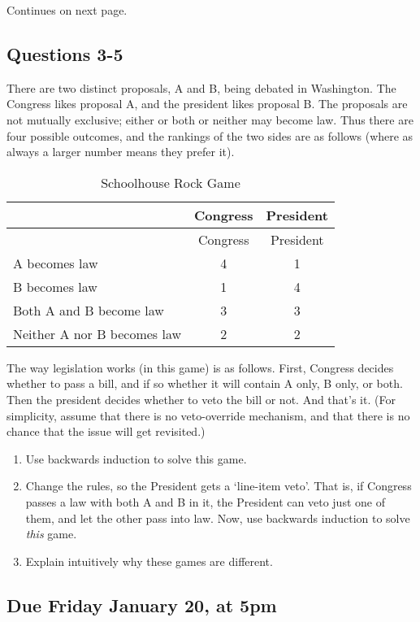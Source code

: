 \documentclass[
  11pt,
]{article}
\providecommand{\tightlist}{%
  \setlength{\itemsep}{0pt}\setlength{\parskip}{0pt}}
\begin{document}
Continues on next page.

\newpage

\hypertarget{questions-3-5}{%
\subsection{Questions 3-5}\label{questions-3-5}}

There are two distinct proposals, A and B, being debated in Washington.
The Congress likes proposal A, and the president likes proposal B. The
proposals are not mutually exclusive; either or both or neither may
become law. Thus there are four possible outcomes, and the rankings of
the two sides are as follows (where as always a larger number means they
prefer it).

\begin{longtable}[]{@{}lcc@{}}
\caption{Schoolhouse Rock Game}\tabularnewline
\toprule()
& Congress & President \\
\midrule()
\endfirsthead
\toprule()
& Congress & President \\
\midrule()
\endhead
A becomes law & 4 & 1 \\
B becomes law & 1 & 4 \\
Both A and B become law & 3 & 3 \\
Neither A nor B becomes law & 2 & 2 \\
\bottomrule()
\end{longtable}

The way legislation works (in this game) is as follows. First, Congress
decides whether to pass a bill, and if so whether it will contain A
only, B only, or both. Then the president decides whether to veto the
bill or not. And that's it. (For simplicity, assume that there is no
veto-override mechanism, and that there is no chance that the issue will
get revisited.)

\begin{enumerate}
\def\labelenumi{\arabic{enumi}.}
\setcounter{enumi}{2}
\tightlist
\item
  Use backwards induction to solve this game.
\item
  Change the rules, so the President gets a `line-item veto'. That is,
  if Congress passes a law with both A and B in it, the President can
  veto just one of them, and let the other pass into law. Now, use
  backwards induction to solve \emph{this} game.
\item
  Explain intuitively why these games are different.
\end{enumerate}

\hypertarget{due-friday-january-20-at-5pm}{%
\subsection{Due Friday January 20, at
5pm}\label{due-friday-january-20-at-5pm}}
\end{document}
